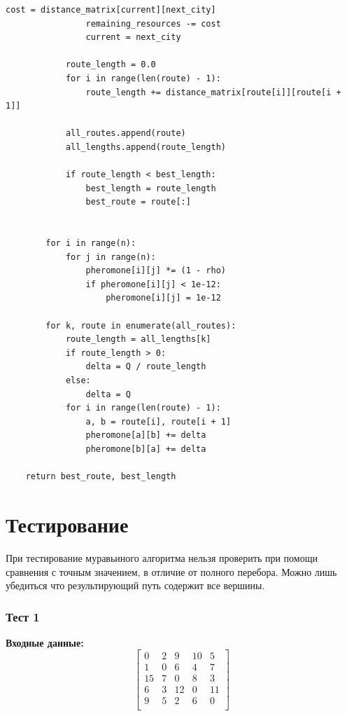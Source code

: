 \begin{lstlisting}[style=python, label=lst:ant,caption=Муравьиный алгоритм]
                cost = distance_matrix[current][next_city]
                remaining_resources -= cost
                current = next_city

            route_length = 0.0
            for i in range(len(route) - 1):
                route_length += distance_matrix[route[i]][route[i + 1]]

            all_routes.append(route)
            all_lengths.append(route_length)

            if route_length < best_length:
                best_length = route_length
                best_route = route[:]


        for i in range(n):
            for j in range(n):
                pheromone[i][j] *= (1 - rho)
                if pheromone[i][j] < 1e-12:
                    pheromone[i][j] = 1e-12

        for k, route in enumerate(all_routes):
            route_length = all_lengths[k]
            if route_length > 0:
                delta = Q / route_length
            else:
                delta = Q
            for i in range(len(route) - 1):
                a, b = route[i], route[i + 1]
                pheromone[a][b] += delta
                pheromone[b][a] += delta

    return best_route, best_length
\end{lstlisting}


\section{Тестирование}

При тестирование муравьиного алгоритма нельзя проверить при помощи сравнения с точным значением, в отличие от полного
перебора. Можно лишь убедиться что результирующий путь содержит все вершины.

\subsubsection*{Тест 1}

\textbf{Входные данные:}
\[
    \begin{bmatrix}
        0  & 2 & 9  & 10 & 5  \\
        1  & 0 & 6  & 4  & 7  \\
        15 & 7 & 0  & 8  & 3  \\
        6  & 3 & 12 & 0  & 11 \\
        9  & 5 & 2  & 6  & 0  \\
    \end{bmatrix}
\]

